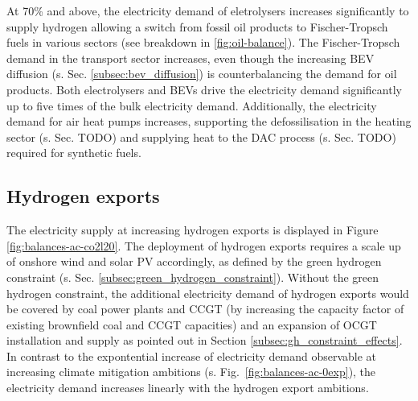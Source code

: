 At 70\% and above, the electricity demand of eletrolysers increases significantly to supply hydrogen allowing a switch from fossil oil products to Fischer-Tropsch fuels in various sectors (see breakdown in \ref{fig:oil-balance}). 
The Fischer-Tropsch demand in the transport sector increases, even though the increasing BEV diffusion (s. Sec. \ref{subsec:bev_diffusion}) is counterbalancing the demand for oil products. 
Both electrolysers and BEVs drive the electricity demand significantly up to five times of the bulk electricity demand. 
Additionally, the electricity demand for air heat pumps increases, supporting the defossilisation in the heating sector (s. Sec. TODO) and supplying heat to the DAC process (s. Sec. TODO) required for synthetic fuels.




\subsection{Hydrogen exports}
\label{subsec:increase_h2}

The electricity supply at increasing hydrogen exports is displayed in Figure \ref{fig:balances-ac-co2l20}. The deployment of hydrogen exports requires a scale up of onshore wind and solar PV accordingly, as defined by the green hydrogen constraint (s. Sec. \ref{subsec:green_hydrogen_constraint}).
Without the green hydrogen constraint, the additional electricity demand of hydrogen exports would be covered by coal power plants and CCGT (by increasing the capacity factor of existing brownfield coal and CCGT capacities) and an expansion of OCGT installation and supply as pointed out in Section \ref{subsec:gh_constraint_effects}.
In contrast to the expontential increase of electricity demand observable at increasing climate mitigation ambitions (s. Fig.~\ref{fig:balances-ac-0exp}), the electricity demand increases linearly with the hydrogen export ambitions.


